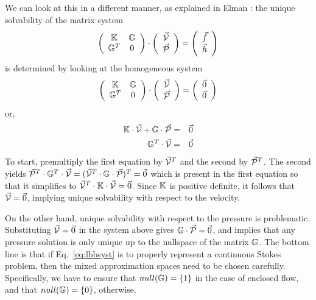 We can look at this in a different manner, as explained in Elman \etal \cite{elsw}:
the unique solvability of the matrix system
\begin{equation}
\left(
\begin{array}{cc}
{\mathbb{K}} & {\mathbb{G}} \\
{\mathbb{G}}^T & 0 
\end{array}
\right)
\cdot 
\left(
\begin{array}{c}
\vec{\cal V} \\ \vec{\cal P}
\end{array}
\right)
=
\left(
\begin{array}{c}
\vec{f} \\ \vec{h}
\end{array}
\right)
\label{eq:lbbsyst}
\end{equation}
is determined by looking at the homogeneous system
\begin{equation}
\left(
\begin{array}{cc}
{\mathbb{K}} & {\mathbb{G}} \\
{\mathbb{G}}^T & 0 
\end{array}
\right)
\cdot 
\left(
\begin{array}{c}
\vec{\cal V} \\ \vec{\cal P}
\end{array}
\right)
=
\left(
\begin{array}{c}
\vec{0} \\ \vec{0}
\end{array}
\right)
\end{equation}
or,
\begin{eqnarray}
{\mathbb{K}} \cdot \vec{\cal V} + {\mathbb{G}} \cdot \vec{\cal P} &=& \vec{0} \nonumber\\
{\mathbb{G}}^T \cdot \vec{\cal V} &=& \vec{0}
\end{eqnarray}
To start, premultiply the first equation by $\vec{\cal V}^T$ and the second by 
$\vec{\cal P}^T$. The second yields
$\vec{\cal P}^T \cdot {\mathbb{G}}^T \cdot \vec{\cal V} = ( \vec{\cal V}^T \cdot {\mathbb{G}}\cdot \vec{\cal P}  )^T = \vec{0}$
which is present in the first equation so that it simplifies to $\vec{\cal V}^T\cdot {\mathbb{K}} \cdot \vec{\cal V} = \vec{0}$.
Since ${\mathbb{K}}$ is positive definite, it follows that $\vec{\cal V}=\vec{0}$, implying unique solvability
with respect to the velocity. 

On the other hand, unique solvability with respect to the pressure is problematic. Substituting $\vec{\cal V}=\vec{0}$
in the system above gives ${\mathbb{G}} \cdot \vec{\cal P} = \vec{0}$, and implies that any pressure solution is only unique 
up to the nullspace of the matrix ${\mathbb{G}}$. 
The bottom line is that if Eq.~\eqref{eq:lbbsyst} is to properly represent a continuous Stokes
problem, then the mixed approximation spaces need to be chosen carefully.
Specifically, we have to ensure that $null({\mathbb{G}})=\{1\}$ in the case of enclosed flow,
and that $null({\mathbb{G}})=\{0\}$, otherwise.



